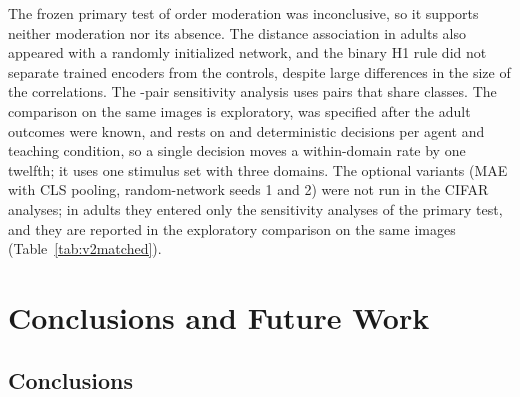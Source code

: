 \documentclass[11pt]{article}
\begin{document}
The frozen primary test of order moderation was inconclusive, so it supports neither moderation nor its absence. The distance association in adults also appeared with a randomly initialized network, and the binary H1 rule did not separate trained encoders from the controls, despite large differences in the size of the correlations. The \VtDallN-pair sensitivity analysis uses pairs that share classes. The comparison on the same images is exploratory, was specified after the adult outcomes were known, and rests on \VtXInN{} and \VtXOutN{} deterministic decisions per agent and teaching condition, so a single decision moves a within-domain rate by one twelfth; it uses one stimulus set with three domains. The optional variants (MAE with CLS pooling, random-network seeds 1 and 2) were not run in the CIFAR analyses; in adults they entered only the sensitivity analyses of the primary test, and they are reported in the exploratory comparison on the same images (Table~\ref{tab:v2matched}).


\section{Conclusions and Future Work}

\subsection{Conclusions}
\end{document}
